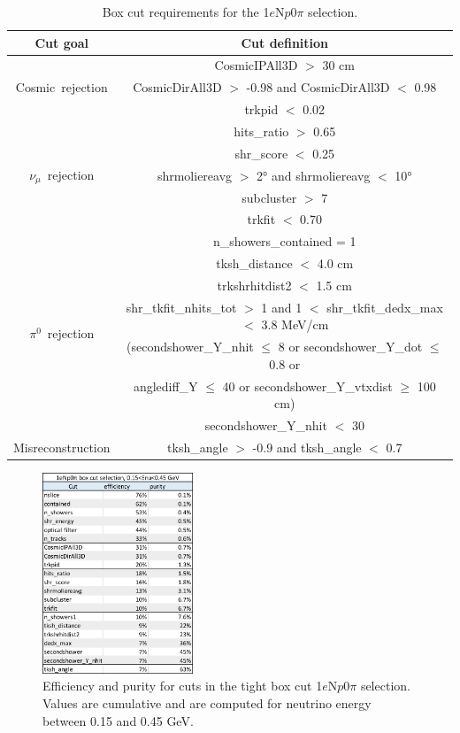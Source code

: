 \documentclass[a4paper]{article}
\newcommand{\npsel}{1$e$N$p$0$\pi$\xspace}
\begin{document}
\begin{table}[h!]
\centering
\setlength{\tabcolsep}{10pt}
\renewcommand{\arraystretch}{1.25}
 \begin{tabular}{| c | c |} 
 \hline
 Cut goal & Cut definition \\
 \hline\hline
\multirow{3}{*}{Cosmic~rejection} & CosmicIPAll3D $>$ 30 \si{\cm} \\
& CosmicDirAll3D $>$ -0.98 and CosmicDirAll3D $<$ 0.98 \\
& trkpid $<$ 0.02 \\
 \hline
\multirow{5}{*}{$\nu_\mu$~rejection} & hits\_ratio $>$ 0.65 \\
 & shr\_score $<$ 0.25 \\
& shrmoliereavg $>$ 2\si{\degree} and shrmoliereavg $<$ 10\si{\degree} \\
& subcluster $>$ 7 \\
& trkfit $<$ 0.70 \\
 \hline
\multirow{7}{*}{$\pi^0$~rejection} & n\_showers\_contained = 1 \\
& tksh\_distance $<$ 4.0 \si{\cm} \\
& trkshrhitdist2 $<$ 1.5 \si{\cm} \\
& shr\_tkfit\_nhits\_tot $>$ 1 and 1 $<$ shr\_tkfit\_dedx\_max $<$ 3.8 \si{\MeV}/\si{\cm} \\
& (secondshower\_Y\_nhit $\leq$ 8 or secondshower\_Y\_dot $\leq$ 0.8 or \\
&  anglediff\_Y $\leq$ 40 or secondshower\_Y\_vtxdist $\geq$ 100 \si{\cm}) \\
& secondshower\_Y\_nhit $<$ 30 \\
 \hline
Misreconstruction & tksh\_angle $>$ -0.9 and tksh\_angle $<$ 0.7 \\
 \hline
 \end{tabular}
 \caption{\label{tab:1eNp:boxcut} Box cut requirements for the \npsel selection.}
\end{table}

\begin{figure}[H]
\begin{center}
\includegraphics[width=0.40\textwidth]{1eNp/cuts-eff-pur-tight.pdf}
\caption{\label{fig:1eNp:cutflow:box} Efficiency and purity for cuts in the tight box cut \npsel selection. Values are cumulative and are computed for neutrino energy between 0.15 and 0.45 GeV. }
\end{center}
\end{figure}
\end{document}
